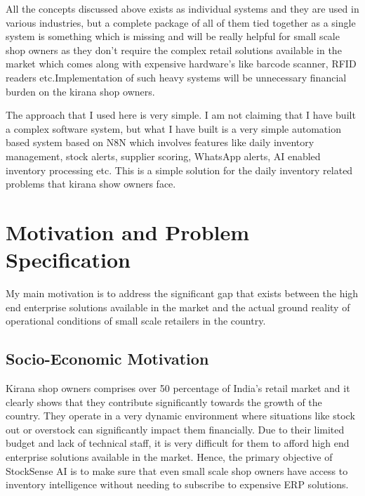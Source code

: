 \documentclass[journal]{IEEEtran}
\begin{document}
All the concepts discussed above exists as individual systems and they are used in various industries, but a complete package of all of them tied together as a single system is something which is missing and will be really helpful for small scale shop owners as they don't require the complex retail solutions available in the market which comes along with expensive hardware's like barcode scanner, RFID readers etc.Implementation of such heavy systems will be unnecessary financial burden on the kirana shop owners.
  
The approach that I used here is very simple. I am not claiming that I have built a complex software system, but what I have built is a very simple automation based system based on N8N which involves features like daily inventory management, stock alerts, supplier scoring, WhatsApp alerts, AI enabled inventory processing etc. This is a simple solution for the daily inventory related problems that kirana show owners face.

\section{Motivation and Problem Specification}

My main motivation is to address the significant gap that exists between the high end enterprise solutions available in the market and the actual ground reality of operational conditions of small scale retailers in the country.

\subsection{Socio-Economic Motivation}
Kirana shop owners comprises over 50 percentage of India's retail market and it clearly shows that they contribute significantly towards the growth of the country. They operate in a very dynamic environment where situations like stock out or overstock can significantly impact them financially. Due to their limited budget and lack of technical staff, it is very difficult for them to afford high end enterprise solutions available in the market. Hence, the primary objective of StockSense AI is to make sure that even small scale shop owners have access to inventory intelligence without needing to subscribe to expensive ERP solutions.
\end{document}
